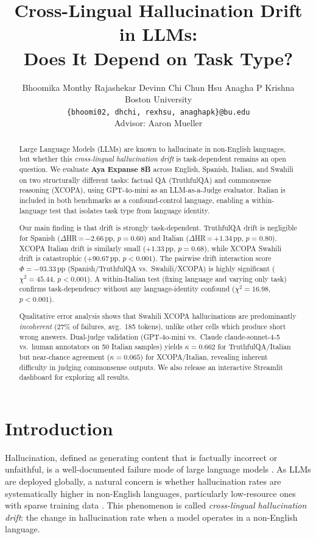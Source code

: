 \documentclass[11pt]{article}
\title{Cross-Lingual Hallucination Drift in LLMs:\\Does It Depend on Task Type?}
\author{
  Bhoomika Monthy Rajashekar \quad Devinn Chi \quad Chun Hsu \quad Anagha P Krishna \\
  Boston University \\
  \texttt{\{bhoomi02, dhchi, rexhsu, anaghapk\}@bu.edu} \\
  Advisor: Aaron Mueller
}
\begin{document}
\maketitle

\begin{abstract}
Large Language Models (LLMs) are known to hallucinate in non-English languages,
but whether this \textit{cross-lingual hallucination drift} is task-dependent
remains an open question. We evaluate \textbf{Aya Expanse 8B} across English,
Spanish, Italian, and Swahili on two structurally different tasks: factual
QA (TruthfulQA) and commonsense reasoning (XCOPA), using GPT-4o-mini as an
LLM-as-a-Judge evaluator. Italian is included in both benchmarks as a
confound-control language, enabling a within-language test that isolates task
type from language identity.

Our main finding is that drift is strongly task-dependent. TruthfulQA drift is
negligible for Spanish ($\Delta$HR\,=\,$-2.66$\,pp, $p=0.60$) and Italian
($\Delta$HR\,=\,$+1.34$\,pp, $p=0.80$). XCOPA Italian drift is similarly small
($+1.33$\,pp, $p=0.68$), while XCOPA Swahili drift is catastrophic
($+90.67$\,pp, $p<0.001$). The pairwise drift interaction score
$\Phi=-93.33$\,pp (Spanish/TruthfulQA vs.\ Swahili/XCOPA) is highly significant
($\chi^2=45.44$, $p<0.001$). A within-Italian test (fixing language and
varying only task) confirms task-dependency without any language-identity
confound ($\chi^2=16.98$, $p<0.001$).

Qualitative error analysis shows that Swahili XCOPA hallucinations are
predominantly \textit{incoherent} (27\% of failures, avg.\ 185 tokens),
unlike other cells which produce short wrong answers. Dual-judge validation
(GPT-4o-mini vs.\ Claude claude-sonnet-4-5 vs.\ human annotators on 50 Italian samples)
yields $\kappa=0.662$ for TruthfulQA/Italian but near-chance agreement
($\kappa=0.065$) for XCOPA/Italian, revealing inherent difficulty in judging
commonsense outputs. We also release an interactive Streamlit dashboard for
exploring all results.
\end{abstract}

\section{Introduction}

Hallucination, defined as generating content that is factually incorrect or
unfaithful, is a well-documented failure mode of large language models
\cite{alansari2025survey}. As LLMs are deployed globally, a natural concern is
whether hallucination rates are systematically higher in non-English languages,
particularly low-resource ones with sparse training data
\cite{blasi-etal-2022-systematic}. This phenomenon is called
\textit{cross-lingual hallucination drift}: the change in hallucination rate
when a model operates in a non-English language.
\end{document}
